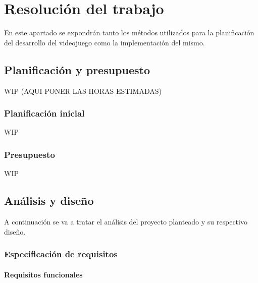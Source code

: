 \chapter{Resolución del trabajo}


En este apartado se expondrán tanto los métodos utilizados para la planificación del 
desarrollo del videojuego como la implementación del mismo.  

\section{Planificación y presupuesto}
WIP (AQUI PONER LAS HORAS ESTIMADAS)

\subsection{Planificación inicial}
WIP

\subsection{Presupuesto}
WIP

\section{Análisis y diseño}

A continuación se va a tratar el análisis del proyecto planteado y su respectivo diseño.

\subsection{Especificación de requisitos}

\subsubsection{Requisitos funcionales}

